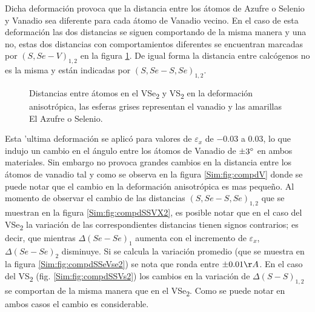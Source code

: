 Dicha deformaci\'on provoca que la distancia entre los \'atomos de Azufre o Selenio y Vanadio  sea diferente para cada \'atomo de Vanadio  vecino. En el caso de esta deformaci\'on las dos distancias se siguen comportando de la misma manera y una no, estas dos distancias con comportamientos diferentes se encuentran marcadas por $(S,Se-V)_{1,2}$ en la figura \ref{Sim:fig:disVX2Anis}. De igual forma la distancia entre calc\'ogenos no es la misma y est\'an indicadas por $(S,Se-S,Se)_{1,2}$. 
\begin{figure}[!hbt]
	\centering
	\caption[Distancias entre \'atomos   VSe\textsubscript{2} y VS\textsubscript{2} utilizados para el estudio de una deformaci\'on anisotr\'opica.]{Distancias entre \'atomos en el VSe\textsubscript{2} y  VS\textsubscript{2} en la deformaci\'on anisotr\'opica, las esferas grises representan el vanadio y las amarillas El Azufre o Selenio.}
	\label{Sim:fig:disVX2Anis}
\end{figure}
Esta 'ultima deformaci\'on se aplic\'o para valores de $\varepsilon_x$ de $-0.03$ a $0.03$, lo que indujo un cambio en el \'angulo entre los \'atomos de Vanadio  de $\pm 3 \degree$ en ambos materiales. Sin embargo no provoca grandes cambios en la distancia entre los \'atomos de vanadio tal y como se observa en la figura \ref{Sim:fig:compdV}  donde se puede notar que el cambio en la deformaci\'on anisotr\'opica es mas peque\~no. Al momento de observar el cambio de las distancias $(S,Se-S,Se)_{1,2}$ que se muestran en la figura \ref{Sim:fig:compdSSVX2}, es posible notar que en el caso del VSe\textsubscript{2}  la variaci\'on de las correspondientes distancias tienen signos contrarios; es decir, que mientras $\Delta (Se-Se)_{1}$  aumenta con el incremento de $\varepsilon_x$,  $\Delta (Se-Se)_{2}$ disminuye. Si se calcula la variaci\'on promedio (que se muestra en la figura \ref{Sim:fig:compdSSeVse2}) se nota que ronda entre $\pm 0.01 \AA$. En el caso del VS\textsubscript{2} (fig. \ref{Sim:fig:compdSSVs2}) los cambios en la variaci\'on de $\Delta (S-S)_{1,2}$  se comportan de la misma manera que en el  VSe\textsubscript{2}. Como se puede notar en  ambos casos el cambio es considerable.
